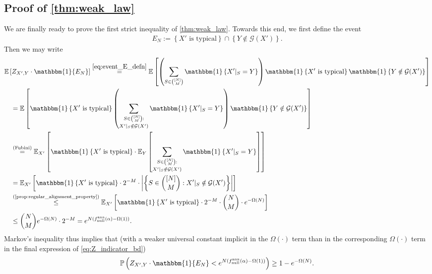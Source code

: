\documentclass[11pt]{amsart}
\numberwithin{equation}{section}
\numberwithin{equation}{section}
\newcommand{\1}{\mathbbm{1}}
\newcommand{\E}{\mathbb{E}}
\newcommand{\Prob}{\mathbb{P}}
\newcommand{\fnullann}{f_{\mathrm{null}}^{\mathrm{ann}}}
\theoremstyle{definition}
\begin{document}
\subsection{\texorpdfstring{Proof of \cref{thm:weak_law}}{Proof of Theorem \ref{thm:weak_law}}} \label{subsec:proof_of_thm}

We are finally ready to prove the first strict inequality of \cref{thm:weak_law}. Towards this end, we first define the event
\begin{align} \label{eq:event_E_defn}
    E_N := \left\{ X' \text{ is typical} \right\} \cap \left\{ Y \notin \mathcal G(X') \right\}.
\end{align}
Then we may write
\begin{align}
    & \E\left[ Z_{X', Y} \cdot \1\{E_N\} \right] \stackrel{\eqref{eq:event_E_defn}}{=} \E\left[ \left( \sum_{S \in \binom{[N]}{M}} \1\left\{ X'|_S = Y \right\} \right) \1\left\{ X' \text{ is typical} \right\} \1\left\{ Y \notin \mathcal G(X') \right\} \right] \nonumber \\
    & \quad = \E\left[ \1\left\{ X' \text{ is typical} \right\} \left( \mathop{\sum_{S \in \binom{[N]}{M}:}}_{X'|_S \notin \mathcal G(X')} \1\left\{ X'|_S = Y \right\} \right) \1\left\{ Y \notin \mathcal G(X') \right\} \right] \nonumber \\
    & \quad \stackrel{\text{(Fubini)}}{=} \E_{X'} \left[ \1\left\{ X' \text{ is typical} \right\} \cdot \E_Y \left[ \mathop{\sum_{S \in \binom{[N]}{M}:}}_{X'|_S \notin \mathcal G(X')} \1\left\{ X'|_S = Y \right\} \right] \right] \nonumber \\
    & \quad = \E_{X'}\left[ \1\left\{ X' \text{ is typical} \right\} \cdot 2^{-M} \cdot \left| \left\{ S \in \binom{[N]}{M}: X'|_S \notin \mathcal G(X') \right\} \right| \right] \nonumber \\
    & \quad \stackrel{\text{(\cref{prop:regular_alignment_property})}}{\leq} \E_{X'}\left[ \1\left\{ X' \text{ is typical} \right\} \cdot 2^{-M} \cdot \binom{N}{M} \cdot e^{-\Omega(N)} \right] \nonumber \\
    & \quad \leq \binom{N}{M}e^{-\Omega(N)} \cdot 2^{-M} = e^{N\left( \fnullann(\alpha) - \Omega(1) \right)}. \label{eq:Z_indicator_bd}
\end{align}
Markov's inequality thus implies that (with a weaker universal constant implicit in the $\Omega(\cdot)$ term than in the corresponding $\Omega(\cdot)$ term in the final expression of \eqref{eq:Z_indicator_bd})
\begin{align*}
    \Prob\left( Z_{X', Y} \cdot \1\{E_N\} < e^{N\left( \fnullann(\alpha) - \Omega(1) \right)} \right) \geq 1 - e^{-\Omega(N)}.
\end{align*}
\end{document}
